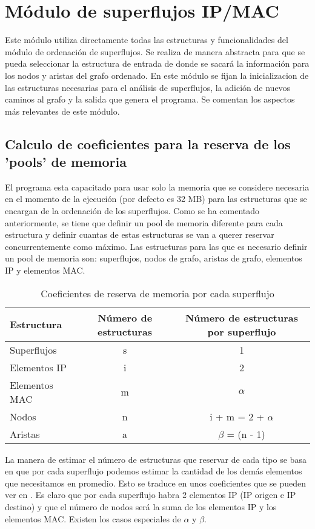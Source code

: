 \documentclass[twoside, 12pt]{epstfg}
\begin{document}
\section{Módulo de superflujos IP/MAC}
Este módulo utiliza directamente todas las estructuras y funcionalidades del módulo de ordenación de superflujos. Se realiza de manera abstracta para que se pueda seleccionar la estructura de entrada de donde se sacará la información para los nodos y aristas del grafo ordenado. En este módulo se fijan la inicializacion de las estructuras necesarias para el análisis de superflujos, la adición de nuevos caminos al grafo y la salida que genera el programa. Se comentan los aspectos más relevantes de este módulo.

\subsection{Calculo de coeficientes para la reserva de los 'pools' de memoria}
El programa esta capacitado para usar solo la memoria que se considere necesaria en el momento de la ejecución (por defecto es 32 MB) para las estructuras que se encargan de la ordenación de los superflujos. Como se ha comentado anteriormente, se tiene que definir un pool de memoria diferente para cada estructura y definir cuantas de estas estructuras se van a querer reservar concurrentemente como máximo. Las estructuras para las que es necesario definir un pool de memoria son: superflujos, nodos de grafo, aristas de grafo, elementos IP y elementos MAC. 

\begin{table}[hbtp]
	\centering
	\small
	\begin{tabular}{lcc}
		\toprule \textbf{Estructura} & \textbf{Número de estructuras}  & \textbf{Número de estructuras por superflujo} \\ \midrule
		Superflujos & s & 1 \\
		Elementos IP & i & 2 \\
		Elementos MAC & m & $\alpha$ \\
		Nodos & n & i + m = 2 + $\alpha$ \\
		Aristas & a & $\beta$ = (n - 1) \\ \bottomrule
	\end{tabular}
	\caption{Coeficientes de reserva de memoria por cada superflujo}
	\label{tab:Desarrollo:Coeficientes memoria}
\end{table}

La manera de estimar el número de estructuras que reservar de cada tipo se basa en que por cada superflujo podemos estimar la cantidad de los demás elementos que necesitamos en promedio. Esto se traduce en unos coeficientes que se pueden ver en . Es claro que por cada superflujo habra 2 elementos IP (IP origen e IP destino) y que el número de nodos será la suma de los elementos IP y los elementos MAC. Existen los casos especiales de $\alpha$ y $\beta$.
\end{document}
